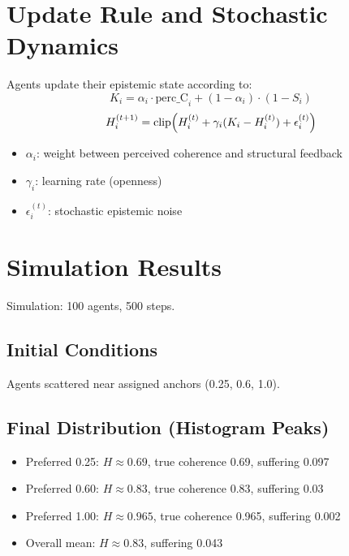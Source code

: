 \documentclass[12pt]{article}
\begin{document}
\section{Update Rule and Stochastic Dynamics}
Agents update their epistemic state according to:
\[
K_i = \alpha_i \cdot \text{perc\_C}_i + (1 - \alpha_i) \cdot (1 - S_i)
\]
\[
H_i^{(t+1)} = \text{clip}\Bigl(H_i^{(t)} + \gamma_i (K_i - H_i^{(t)}) + \epsilon_i^{(t)} \Bigr)
\]
\begin{itemize}
    \item \(\alpha_i\): weight between perceived coherence and structural feedback
    \item \(\gamma_i\): learning rate (openness)
    \item \(\epsilon_i^{(t)}\): stochastic epistemic noise
\end{itemize}

\section{Simulation Results}
Simulation: 100 agents, 500 steps.

\subsection{Initial Conditions}
Agents scattered near assigned anchors (0.25, 0.6, 1.0).

\subsection{Final Distribution (Histogram Peaks)}
\begin{itemize}
    \item Preferred 0.25: \(H \approx 0.69\), true coherence 0.69, suffering 0.097
    \item Preferred 0.60: \(H \approx 0.83\), true coherence 0.83, suffering 0.03
    \item Preferred 1.00: \(H \approx 0.965\), true coherence 0.965, suffering 0.002
    \item Overall mean: \(H \approx 0.83\), suffering 0.043
\end{itemize}
\end{document}
